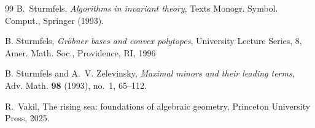 \documentclass[11pt]{amsart}
\numberwithin{equation}{section}
\begin{document}
\begin{thebibliography}{99}
B.~Sturmfels, 
\emph{Algorithms in invariant theory}, Texts Monogr. Symbol. Comput., Springer (1993).

B. Sturmfels, \emph{Gr\"obner bases and convex polytopes}, University Lecture Series, 8, Amer. Math. Soc., Providence, RI, 1996

 B. Sturmfels and A.~V. Zelevinsky, \emph{Maximal minors and their leading terms}, Adv. Math. {\bf 98} (1993), no.~1, 65--112.

R.~Vakil, The rising sea: foundations of algebraic geometry,
Princeton University Press, 2025.


\end{thebibliography}
\end{document}
